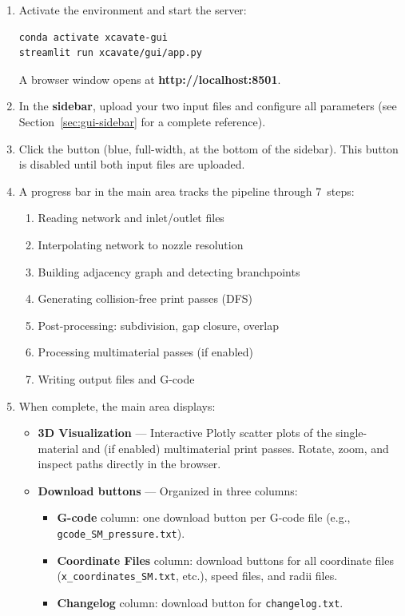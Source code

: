 \documentclass[11pt,letterpaper]{article}
\newcommand{\code}[1]{\texttt{#1}}
\newcommand{\btn}[1]{\fbox{\textsf{#1}}}
\begin{document}
\begin{enumerate}
    \item Activate the environment and start the server:
    \begin{lstlisting}
conda activate xcavate-gui
streamlit run xcavate/gui/app.py
    \end{lstlisting}
    A browser window opens at \textbf{http://localhost:8501}.

    \item In the \textbf{sidebar}, upload your two input files and configure all parameters (see Section~\ref{sec:gui-sidebar} for a complete reference).

    \item Click the \btn{Run X-CAVATE} button (blue, full-width, at the bottom of the sidebar). This button is disabled until both input files are uploaded.

    \item A progress bar in the main area tracks the pipeline through 7~steps:
    \begin{enumerate}
        \item Reading network and inlet/outlet files
        \item Interpolating network to nozzle resolution
        \item Building adjacency graph and detecting branchpoints
        \item Generating collision-free print passes (DFS)
        \item Post-processing: subdivision, gap closure, overlap
        \item Processing multimaterial passes (if enabled)
        \item Writing output files and G-code
    \end{enumerate}

    \item When complete, the main area displays:
    \begin{itemize}
        \item \textbf{3D Visualization} --- Interactive Plotly scatter plots of the single-material and (if enabled) multimaterial print passes. Rotate, zoom, and inspect paths directly in the browser.
        \item \textbf{Download buttons} --- Organized in three columns:
        \begin{itemize}
            \item \textbf{G-code} column: one download button per G-code file (e.g., \code{gcode\_SM\_pressure.txt}).
            \item \textbf{Coordinate Files} column: download buttons for all coordinate files (\code{x\_coordinates\_SM.txt}, etc.), speed files, and radii files.
            \item \textbf{Changelog} column: download button for \code{changelog.txt}.
        \end{itemize}
    \end{itemize}


\end{enumerate}
\end{document}
